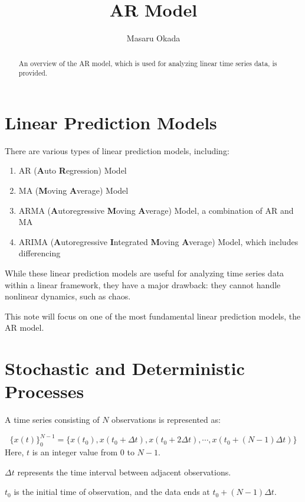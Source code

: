 \documentclass[uplatex,a4j,12pt,dvipdfmx]{jsarticle}
\title{
AR Model
}
\author{
Masaru Okada
}
\begin{document}
\maketitle

\begin{abstract}
	An overview of the AR model, which is used for analyzing linear time series data, is provided.
\end{abstract}

\section{Linear Prediction Models}

There are various types of linear prediction models, including:

\begin{enumerate}
	\item AR (\textbf{A}uto \textbf{R}egression) Model
	\item MA (\textbf{M}oving \textbf{A}verage) Model
	\item ARMA (\textbf{A}utoregressive \textbf{M}oving \textbf{A}verage) Model, a combination of AR and MA
	\item ARIMA (\textbf{A}utoregressive \textbf{I}ntegrated \textbf{M}oving \textbf{A}verage) Model, which includes differencing
\end{enumerate}

While these linear prediction models are useful for analyzing time series data within a linear framework, they have a major drawback: they cannot handle nonlinear dynamics, such as chaos.

This note will focus on one of the most fundamental linear prediction models, the AR model.


\section{Stochastic and Deterministic Processes}

A time series consisting of $N$ observations is represented as:

\[
	\{ x(t) \}^{N-1}_{0} = \{ x(t_{0}), x(t_{0} + \Delta t) , x(t_{0} + 2\Delta t) , \cdots , x(t_{0} +  (N-1) \Delta t) \}
\]
Here, $t$ is an integer value from $0$ to $N-1$.

$\Delta t$ represents the time interval between adjacent observations.

$t_{0}$ is the initial time of observation, and the data ends at $t_{0} +  (N-1) \Delta t$.
\end{document}
